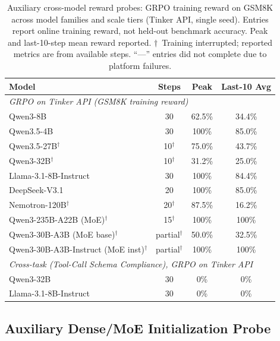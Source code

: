 \begin{table}[htbp]
\centering
\caption{Auxiliary cross-model reward probes: GRPO training reward on GSM8K across model families and scale tiers (Tinker API, single seed). Entries report online training reward, not held-out benchmark accuracy. Peak and last-10-step mean reward reported. $\dagger$~Training interrupted; reported metrics are from available steps. ``---'' entries did not complete due to platform failures.}
\label{tab:cross_arch_scaling}
\begin{tabular}{@{}lccc@{}}
\toprule
\textbf{Model} & \textbf{Steps} & \textbf{Peak} & \textbf{Last-10 Avg} \\
\midrule
\multicolumn{4}{l}{\textit{GRPO on Tinker API (GSM8K training reward)}} \\
\midrule
Qwen3-8B & 30 & 62.5\% & 34.4\% \\
Qwen3.5-4B & 30 & 100\% & 85.0\% \\
Qwen3.5-27B$^\dagger$ & 10$^\dagger$ & 75.0\% & 43.7\% \\
Qwen3-32B$^\dagger$ & 10$^\dagger$ & 31.2\% & 25.0\% \\
Llama-3.1-8B-Instruct & 30 & 100\% & 84.4\% \\
DeepSeek-V3.1 & 20 & 100\% & 85.0\% \\
Nemotron-120B$^\dagger$ & 20$^\dagger$ & 87.5\% & 16.2\% \\
Qwen3-235B-A22B (MoE)$^\dagger$ & 15$^\dagger$ & 100\% & 100\% \\
Qwen3-30B-A3B (MoE base)$^\dagger$ & partial$^\dagger$ & 50.0\% & 32.5\% \\
Qwen3-30B-A3B-Instruct (MoE inst)$^\dagger$ & partial$^\dagger$ & 100\% & 100\% \\
\midrule
\multicolumn{4}{l}{\textit{Cross-task (Tool-Call Schema Compliance), GRPO on Tinker API}} \\
\midrule
Qwen3-32B & 30 & 0\% & 0\% \\
Llama-3.1-8B-Instruct & 30 & 0\% & 0\% \\
\bottomrule
\end{tabular}
\end{table}


\subsection{Auxiliary Dense/MoE Initialization Probe}
\label{sec:dense_moe}

